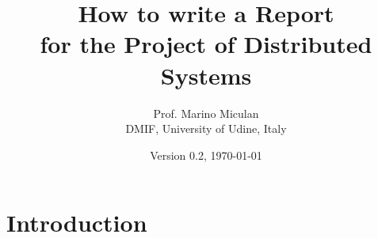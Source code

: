\documentclass[a4paper, oneside]{memoir}
\title{How to write a Report\\ for the Project of Distributed Systems}
\author{Prof. Marino Miculan\\ DMIF, University of Udine, Italy}
\date{Version 0.2, \today}
\begin{document}
\maketitle

\chapter{Introduction}\label{ch:intro}

\end{document}
